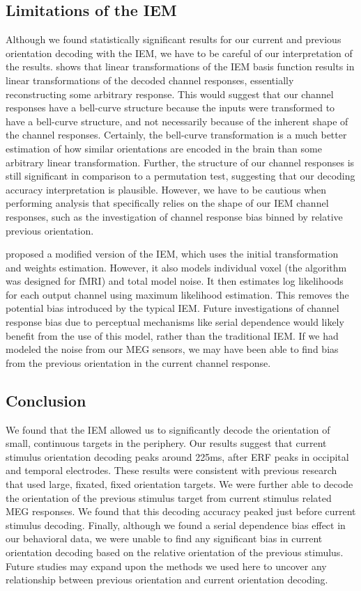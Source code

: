 \documentclass[../main.tex]{subfiles}
\begin{document}
\subsection*{Limitations of the IEM}
Although we found statistically significant results for our current and previous orientation decoding with the IEM, we have to be careful of our interpretation of the results. \cite{Gardner19} shows that linear transformations of the IEM basis function results in linear transformations of the decoded channel responses, essentially reconstructing some arbitrary response. This would suggest that our channel responses have a bell-curve structure because the inputs were transformed to have a bell-curve structure, and not necessarily because of the inherent shape of the channel responses. Certainly, the bell-curve transformation is a much better estimation of how similar orientations are encoded in the brain than some arbitrary linear transformation. Further, the structure of our channel responses is still significant in comparison to a permutation test, suggesting that our decoding accuracy interpretation is plausible. However, we have to be cautious when performing analysis that specifically relies on the shape of our IEM channel responses, such as the investigation of channel response bias binned by relative previous orientation. 

\cite{vanBergen} proposed a modified version of the IEM, which uses the initial transformation and weights estimation. However, it also models individual voxel (the algorithm was designed for fMRI) and total model noise. It then estimates log likelihoods for each output channel using maximum likelihood estimation. This removes the potential bias introduced by the typical IEM. Future investigations of channel response bias due to perceptual mechanisms like serial dependence would likely benefit from the use of this model, rather than the traditional IEM. If we had modeled the noise from our MEG sensors, we may have been able to find bias from the previous orientation in the current channel response.

\subsection*{Conclusion}
We found that the IEM allowed us to significantly decode the orientation of small, continuous targets in the periphery. Our results suggest that current stimulus orientation decoding peaks around 225ms, after ERF peaks in occipital and temporal electrodes. These results were consistent with previous research that used large, fixated, fixed orientation targets. We were further able to decode the orientation of the previous stimulus target from current stimulus related MEG responses. We found that this decoding accuracy peaked just before current stimulus decoding. Finally, although we found a serial dependence bias effect in our behavioral data, we were unable to find any significant bias in current orientation decoding based on the relative orientation of the previous stimulus. Future studies may expand upon the methods we used here to uncover any relationship between previous orientation and current orientation decoding.
\end{document}
